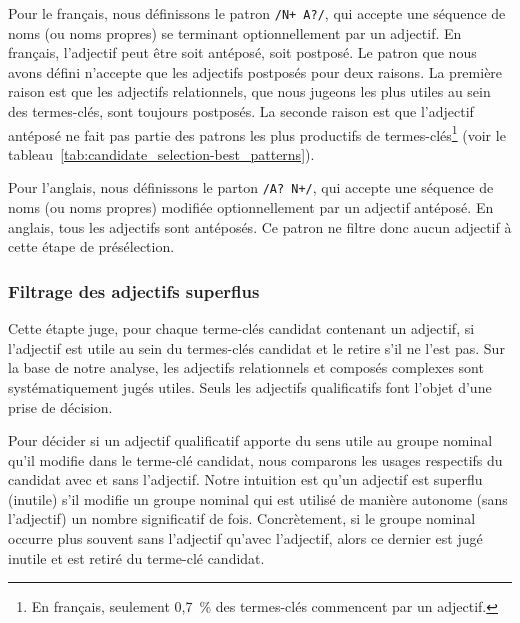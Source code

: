         Pour le français, nous définissons le patron \texttt{/N+ A?/}, qui
        accepte une séquence de noms (ou noms propres) se terminant
        optionnellement par un adjectif. En français, l'adjectif peut être soit
        antéposé, soit postposé. Le patron que nous avons défini n'accepte que
        les adjectifs postposés pour deux raisons. La première raison est que
        les adjectifs relationnels, que nous jugeons les
        plus utiles au sein des termes-clés, sont toujours postposés. La seconde
        raison est que l'adjectif antéposé ne fait pas partie des patrons les
        plus productifs de termes-clés\footnote{En français, seulement 0,7~\%
        des termes-clés commencent par un adjectif.} (voir le
        tableau~\ref{tab:candidate_selection-best_patterns}).
        
        Pour l'anglais, nous définissons le parton \texttt{/A? N+/}, qui accepte
        une séquence de noms (ou noms propres) modifiée optionnellement par un
        adjectif antéposé. En anglais, tous les adjectifs sont antéposés. Ce
        patron ne filtre donc aucun adjectif à cette étape de présélection.

      \subsubsection{Filtrage des adjectifs superflus}
      \label{subsubsec:main:domain_independent_keyphrase_extraction-keyphrase_candidate_selection-modifiers_filtering-adjective_filtering}
        Cette étapte juge, pour chaque terme-clés candidat contenant un
        adjectif, si l'adjectif est utile au sein du termes-clés candidat et le
        retire s'il ne l'est pas. Sur la base de notre analyse, les adjectifs
        relationnels et composés complexes sont systématiquement jugés utiles.
        Seuls les adjectifs qualificatifs font l'objet d'une prise de décision.

        Pour décider si un adjectif qualificatif apporte du sens utile au groupe
        nominal qu'il modifie dans le terme-clé candidat, nous comparons les
        usages respectifs du candidat avec et sans l'adjectif. Notre intuition
        est qu'un adjectif est superflu (inutile) s'il modifie un groupe nominal
        qui est utilisé de manière autonome (sans l'adjectif) un nombre
        significatif de fois. Concrètement, si le groupe nominal occurre plus
        souvent sans l'adjectif qu'avec l'adjectif, alors ce dernier est jugé
        inutile et est retiré du terme-clé candidat.

